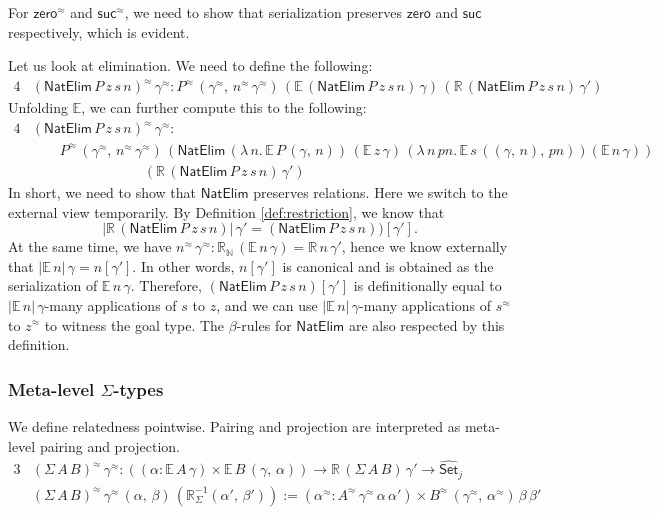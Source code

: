 \documentclass[acmsmall,anonymous,review]{acmart}
\newcommand{\mit}[1]{\mathit{#1}}
\newcommand{\msf}[1]{\mathsf{#1}}
\newcommand{\mbb}[1]{\mathbb{#1}}
\newcommand{\wh}[1]{\widehat{#1}}
\newcommand{\zero}{\msf{zero}}
\newcommand{\suc}{\msf{suc}}
\newcommand{\Set}{\mathsf{Set}}
\newcommand{\ev}{\mbb{E}}
\newcommand{\re}{\mbb{R}}
\theoremstyle{remark}
\newcommand{\whset}{\wh{\Set}}
\newcommand{\rel}{^{\approx}}
\begin{document}
For $\zero\rel$ and $\suc\rel$, we need to show that serialization preserves
$\zero$ and $\suc$ respectively, which is evident.

Let us look at elimination. We need to define the following:
\begin{alignat*}{4}
  &(\msf{NatElim}\,P\,z\,s\,n)\rel\,\gamma\rel :
  P\rel\,(\gamma\rel,\,n\rel\,\gamma\rel)\,(\ev\,(\msf{NatElim}\,P\,z\,s\,n)\,\gamma)\,
                                           (\re\,(\msf{NatElim}\,P\,z\,s\,n)\,\gamma')
\end{alignat*}
Unfolding $\ev$, we can further compute this to the following:
\begin{alignat*}{4}
  &(\msf{NatElim}\,P\,z\,s\,n)\rel\,\gamma\rel : \\
  &\hspace{2em}P\rel\,(\gamma\rel,\,n\rel\,\gamma\rel)\,
  (\msf{NatElim}\,(\lambda\,n.\,\ev\,P\,(\gamma,\,n))\,
                  (\ev\,z\,\gamma)\,
                  (\lambda\,n\,\mit{pn}.\,\ev\,s\,((\gamma,\,n),\,\mit{pn}))
                  (\ev\,n\,\gamma))\\
  &\hspace{8em}(\re\,(\msf{NatElim}\,P\,z\,s\,n)\,\gamma')
\end{alignat*}
In short, we need to show that $\msf{NatElim}$ preserves relations. Here we
switch to the external view temporarily. By Definition \ref{def:restriction}, we know that
\[
   |\re\,(\msf{NatElim}\,P\,z\,s\,n)|\,\gamma' = (\msf{NatElim}\,P\,z\,s\,n))[\gamma'].
\]
At the same time, we have $n\rel\,\gamma\rel : \re_{\mbb{N}}\,(\ev\,n\,\gamma) =
\re\,n\,\gamma'$, hence we know externally that $|\ev\,n|\,\gamma = n[\gamma']$.
In other words, $n[\gamma']$ is canonical and is obtained as the serialization
of $\ev\,n\,\gamma$. Therefore, $(\msf{NatElim}\,P\,z\,s\,n)[\gamma']$ is
definitionally equal to $|\ev\,n|\,\gamma$-many applications of $s$ to
$z$, and we can use $|\ev\,n|\,\gamma$-many applications of $s\rel$ to $z\rel$
to witness the goal type. The $\beta$-rules for $\msf{NatElim}$ are also respected
by this definition.

\subsubsection{Meta-level $\Sigma$-types} We define relatedness pointwise. Pairing and projection
are interpreted as meta-level pairing and projection.
\begin{alignat*}{3}
  &(\Sigma\,A\,B)\rel\,\gamma\rel : ((\alpha : \ev\,A\,\gamma) \times \ev\,B\,(\gamma,\,\alpha))
             \to \re\,(\Sigma\,A\,B)\,\gamma' \to \whset_j\\
  &(\Sigma\,A\,B)\rel\,\gamma\rel\,(\alpha,\,\beta)\,(\re_{\Sigma}^{-1}(\alpha',\,\beta')) :=
             (\alpha\rel : A\rel\,\gamma\rel\,\alpha\,\alpha') \times B\rel\,(\gamma\rel,\,\alpha\rel)\,\beta\,\beta'
\end{alignat*}
\end{document}
